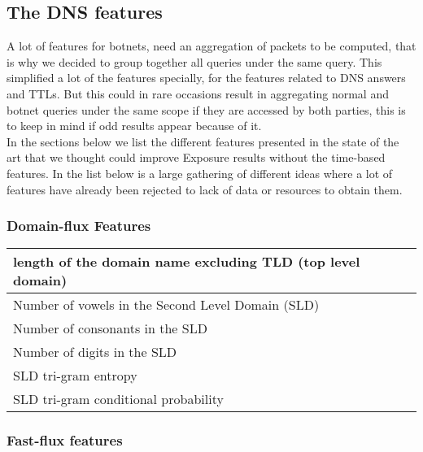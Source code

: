\subsection{The DNS features}
A lot of features for botnets, need an aggregation of packets to be computed, that is why we decided to group together all queries under the same query. This simplified a lot of the features specially, for the features related to DNS answers and TTLs. But this could in rare occasions result in aggregating normal and botnet queries under the same scope if they are accessed by both parties, this is to keep in mind if odd results appear because of it.\\
In the sections below we list the different features presented in the state of the art that we thought could improve Exposure results without the time-based features. In the list below is a large gathering of different ideas where a lot of features have already been rejected to lack of data or resources to obtain them.
\subsubsection{Domain-flux Features}

\begin{tabular}{|l|}
\hline
length of the domain name excluding TLD (top level domain)\\
\hline
Number of vowels in the Second Level Domain (SLD)\\
\hline
Number of consonants in the SLD\\
\hline
Number of digits in the SLD\\
\hline
SLD tri-gram entropy\\
\hline
SLD tri-gram conditional probability\\
\hline
\end{tabular}

\subsubsection{Fast-flux features}

